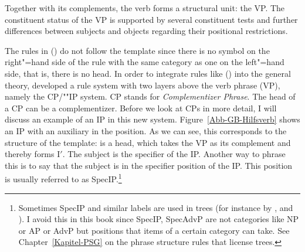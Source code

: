 Together with its complements, the verb forms a structural unit: the VP. The constituent status of
the VP is supported by several constituent tests and further differences
between subjects and objects regarding their positional restrictions.

The rules in () do not follow the \xbar template since there is no symbol on the right"=hand side of the rule with the same
category as one on the left"=hand side, that is, there is no head. In order to integrate rules like
() into the general theory, \citet[]{Chomsky86b} developed a rule system with
two layers above the verb phrase (VP), namely the CP/""IP system. CP stands for \emph{Complementizer Phrase}.
The head of a CP can be a complementizer. Before we look at CPs in more detail, I will discuss an example of an IP in this new system. 
Figure~\vref{Abb-GB-Hilfsverb} shows an IP with an auxiliary in the \inull position. As we can see, this corresponds to the structure of
the \xbar template: \inull is a head, which takes the VP as its complement and thereby forms I$'$. The subject is the specifier 
of the IP. Another way to phrase this is to say that the subject is in the specifier position of the
IP. This position is usually referred to as SpecIP.\footnote{\label{fn-specxp-in-trees}%
  Sometimes SpecIP and similar labels are used in trees (for instance by \citet{Haegeman94a-u}, \citet{Meinunger2000a} and \citet{Lohnstein2014a}). I
  avoid this in this book since SpecIP, SpecAdvP are not categories like NP or AP or AdvP but
  positions that items of a certain category can take. See Chapter~\ref{Kapitel-PSG} on the phrase
  structure rules that license trees.
}
%

